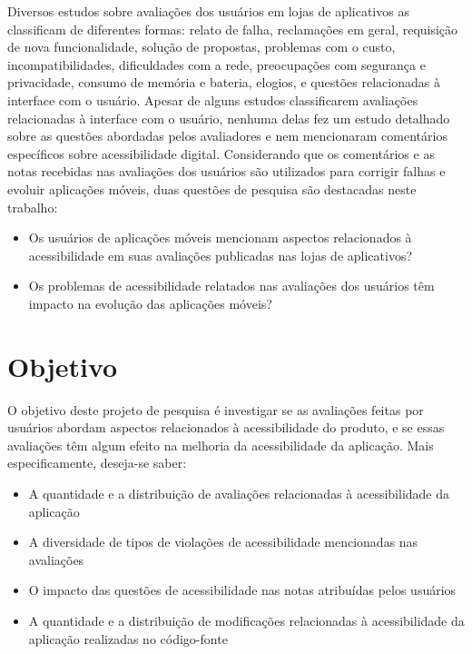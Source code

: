 Diversos estudos sobre avaliações dos usuários em lojas de aplicativos as classificam de diferentes formas\cite{Iacob2013retrieving,Pagano2013userfeedback,Iacob2014online,Mcilroy2016analyzing,Sorbo2017surf,Ciurumelea2017analyzing,Ortega2015thesis,Li2018MobileAE,Pelloni2018becloma,Panichella2015how}: 
relato de falha, reclamações em geral, requisição de nova funcionalidade, solução de propostas, problemas com o custo, incompatibilidades, dificuldades com a rede, preocupações com segurança e privacidade, consumo de memória e bateria, elogios, e questões relacionadas à interface com o usuário.
Apesar de alguns estudos classificarem avaliações relacionadas à interface com o usuário, nenhuma delas fez um estudo detalhado sobre as questões abordadas pelos avaliadores e nem mencionaram comentários específicos sobre acessibilidade digital.
Considerando que os comentários e as notas recebidas nas avaliações dos usuários são utilizados para corrigir falhas e evoluir aplicações móveis, duas questões de pesquisa são destacadas neste trabalho:
\begin{itemize}
 \item Os usuários de aplicações móveis mencionam aspectos relacionados à acessibilidade em suas avaliações publicadas nas lojas de aplicativos?
 \item Os problemas de acessibilidade relatados nas avaliações dos usuários têm impacto na evolução das aplicações móveis?
\end{itemize}

\section{Objetivo} 

O objetivo deste projeto de pesquisa é investigar se as avaliações feitas por usuários abordam aspectos relacionados à acessibilidade do produto, e se essas avaliações têm algum efeito na melhoria da acessibilidade da aplicação. Mais especificamente, deseja-se saber:
\begin{itemize}
 \item A quantidade e a distribuição de avaliações relacionadas à acessibilidade da aplicação
 \item A diversidade de tipos de violações de acessibilidade mencionadas nas avaliações
 \item O impacto das questões de acessibilidade nas notas atribuídas pelos usuários
 \item A quantidade e a distribuição de modificações relacionadas à acessibilidade da aplicação realizadas no código-fonte
\end{itemize}



